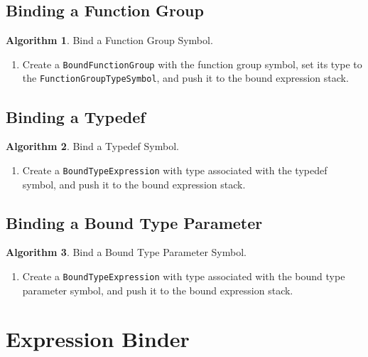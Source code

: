 \documentclass[a4paper,oneside,11pt]{book}
\theoremstyle{definition}
\newtheorem{algo}{Algorithm}[section]
\begin{document}
\subsection{Binding a Function Group}

\begin{algo}\label{bindfunctiongroupsymbol} Bind a Function Group Symbol.
\begin{enumerate}
\item
Create a \verb|BoundFunctionGroup| with the function group symbol, set its type to the \verb|FunctionGroupTypeSymbol|, and push it to the bound expression stack.
\end{enumerate}
\end{algo}

\subsection{Binding a Typedef}

\begin{algo}\label{bindtypedefsymbol} Bind a Typedef Symbol.
\begin{enumerate}
\item
Create a \verb|BoundTypeExpression| with type associated with the typedef symbol, and push it to the bound expression stack.
\end{enumerate}
\end{algo}

\subsection{Binding a Bound Type Parameter}

\begin{algo}\label{bindboundtypeparametersymbol} Bind a Bound Type Parameter Symbol.
\begin{enumerate}
\item
Create a \verb|BoundTypeExpression| with type associated with the bound type parameter symbol, and push it to the bound expression stack.
\end{enumerate}
\end{algo}

\section{Expression Binder}
\end{document}

